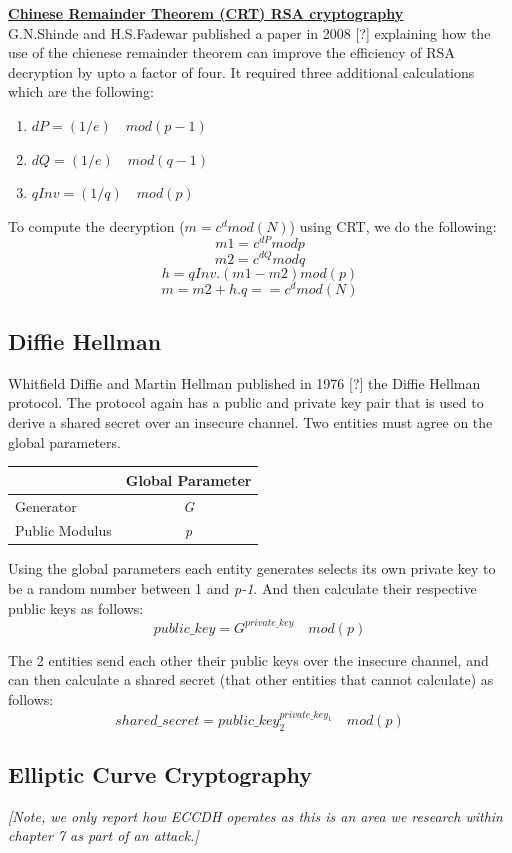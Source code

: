 \documentclass[bsc,frontabs,twoside,singlespacing,parskip,deptreport]{infthesis}     %
\begin{document}
\underline{\textbf{Chinese Remainder Theorem (CRT) RSA cryptography}}\\

G.N.Shinde and H.S.Fadewar published a paper in 2008 [?] explaining how the use of the chienese remainder theorem can improve the efficiency of RSA decryption by upto a factor of four. It required three additional calculations which are the following:
\begin{enumerate}
\item $dP = (1/e)\quad  mod (p-1)$
\item $dQ = (1/e) \quad mod (q-1)$
\item $qInv = (1/q) \quad mod (p)$
\end{enumerate}

To compute the decryption ($m= c^d mod(N)$) using CRT, we do the following:
$$m1 = c^{dP} mod p$$
$$m2 = c^{dQ} mod q$$
$$h = qInv.(m1 - m2) mod (p)$$
$$ m = m2 + h.q  == c^d mod (N)$$


\subsection{Diffie Hellman}
Whitfield Diffie and Martin Hellman published in 1976 [?] the Diffie Hellman protocol. The protocol again has a public and private key pair that is used to derive a shared secret over an insecure channel. Two entities must agree on the global parameters.

\begin{table}[H]
\begin{tabular}{|l|c|}
\hline
 & Global Parameter\\
\hline
Generator & \textit{G}\\
\hline
Public Modulus & \textit{p}\\
\hline
\end{tabular}
\end{table}

Using the global parameters each entity generates selects its own private key to be a random number between 1 and \textit{p-1}. And then calculate their respective public keys as follows:
$$ public\_key = G^{private\_key} \quad mod (p)$$

The 2 entities send each other their public keys over the insecure channel, and can then calculate a shared secret (that other entities that cannot calculate) as follows:
$$ shared\_secret = public\_key_2^{private\_key_1} \quad mod (p) $$

\subsection{Elliptic Curve Cryptography}
\textit{[Note, we only report how ECCDH operates as this is an area we research within chapter 7 as part of an attack.]}
\end{document}

